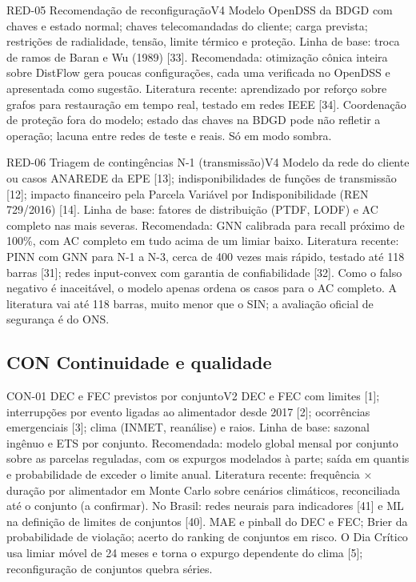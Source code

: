 \begin{ficha}{RED-05 \textperiodcentered{} Recomendação de reconfiguração}{V4}
 Modelo OpenDSS da BDGD com chaves e estado normal; chaves
telecomandadas do cliente; carga prevista; restrições de radialidade, tensão,
limite térmico e proteção.
 Linha de base: troca de ramos de Baran e Wu (1989) [33].
Recomendada: otimização cônica inteira sobre DistFlow gera poucas
configurações, cada uma verificada no OpenDSS e apresentada como sugestão.
Literatura recente: aprendizado por reforço sobre grafos para restauração em
tempo real, testado em redes IEEE [34].
 Coordenação de proteção fora do modelo; estado das chaves
na BDGD pode não refletir a operação; lacuna entre redes de teste e reais.
Só em modo sombra.
\end{ficha}

\begin{ficha}{RED-06 \textperiodcentered{} Triagem de contingências N-1 (transmissão)}{V4}
 Modelo da rede do cliente ou casos ANAREDE da EPE [13];
indisponibilidades de funções de transmissão [12]; impacto financeiro pela
Parcela Variável por Indisponibilidade (REN 729/2016) [14].
 Linha de base: fatores de distribuição (PTDF, LODF) e AC
completo nas mais severas. Recomendada: GNN calibrada para recall próximo de
100\%, com AC completo em tudo acima de um limiar baixo. Literatura recente: PINN
com GNN para N-1 a N-3, cerca de 400 vezes mais rápido, testado até 118 barras
[31]; redes input-convex com garantia de confiabilidade [32].
 Como o falso negativo é inaceitável, o modelo apenas ordena
os casos para o AC completo. A
literatura vai até 118 barras, muito menor que o SIN; a avaliação oficial de
segurança é do ONS.
\end{ficha}

\subsection{CON \textperiodcentered{} Continuidade e qualidade}

\begin{ficha}{CON-01 \textperiodcentered{} DEC e FEC previstos por conjunto}{V2}
 DEC e FEC com limites [1]; interrupções por evento ligadas ao
alimentador desde 2017 [2]; ocorrências emergenciais [3]; clima (INMET,
reanálise) e raios.
 Linha de base: sazonal ingênuo e ETS por conjunto.
Recomendada: modelo global mensal por conjunto sobre as parcelas reguladas,
com os expurgos modelados à parte; saída em quantis e probabilidade de
exceder o limite anual. Literatura recente: frequência × duração por alimentador
em Monte Carlo sobre cenários climáticos, reconciliada até o conjunto (a
confirmar). No Brasil: redes neurais para indicadores [41] e ML na definição
de limites de conjuntos [40].
 MAE e pinball do DEC e FEC; Brier da probabilidade de
violação; acerto do ranking de conjuntos em risco.
 O Dia Crítico usa limiar móvel de 24 meses e torna o
expurgo dependente do clima [5]; reconfiguração de conjuntos quebra séries.
\end{ficha}

